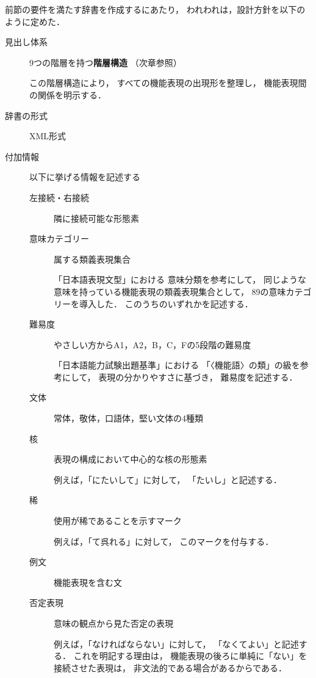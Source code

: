 \documentclass[japanese]{jnlp_1.3e}
\begin{document}
前節の要件を満たす辞書を作成するにあたり，
われわれは，設計方針を以下のように定めた．
\begin{description}
 \item[見出し体系] 9つの階層を持つ{\bf 階層構造}
            （次章参照）

            この階層構造により，
            すべての機能表現の出現形を整理し，
            機能表現間の関係を明示する．

 \item[辞書の形式] XML形式
 \item[付加情報] 以下に挙げる情報を記述する
 \begin{description}
  \item[左接続・右接続] 隣に接続可能な形態素
             
  \item[意味カテゴリー] 属する類義表現集合

             「日本語表現文型」における
             意味分類を参考にして，
             同じような意味を持っている機能表現の類義表現集合として，
             89の意味カテゴリーを導入した．
             このうちのいずれかを記述する．

  \item[難易度] やさしい方からA1，A2，B，C，Fの5段階の難易度

             「日本語能力試験出題基準」における
             「〈機能語〉の類」の級を参考にして，
             表現の分かりやすさに基づき，
             難易度を記述する．

  \item[文体] 常体，敬体，口語体，堅い文体の4種類
             
  \item[核] 表現の構成において中心的な核の形態素

             例えば，「にたいして」に対して，
             「たいし」と記述する．

  \item[稀] 使用が稀であることを示すマーク

             例えば，「て呉れる」に対して，
             このマークを付与する．

  \item[例文] 機能表現を含む文

  \item[否定表現] 意味の観点から見た否定の表現

             例えば，「なければならない」に対して，
             「なくてよい」と記述する．
             これを明記する理由は，
             機能表現の後ろに単純に「ない」を接続させた表現は，
             非文法的である場合があるからである．


\end{description}
\end{description}
\end{document}
